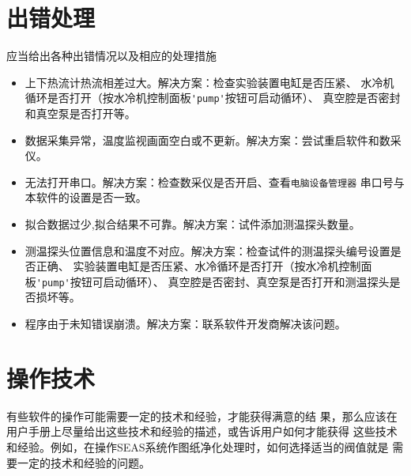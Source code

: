 \section{出错处理}
应当给出各种出错情况以及相应的处理措施
\begin{itemize}
    \item 上下热流计热流相差过大。解决方案：检查实验装置电缸是否压紧、
    水冷机循环是否打开（按水冷机控制面板\lstinline{'pump'}按钮可启动循环）、
    真空腔是否密封和真空泵是否打开等。
    \item 数据采集异常，温度监视画面空白或不更新。解决方案：尝试重启软件和数采仪。
    \item 无法打开串口。解决方案：检查数采仪是否开启、查看\lstinline{电脑设备管理器}
    串口号与本软件的设置是否一致。
    \item 拟合数据过少,拟合结果不可靠。解决方案：试件添加测温探头数量。
    \item 测温探头位置信息和温度不对应。解决方案：检查试件的测温探头编号设置是否正确、
    实验装置电缸是否压紧、水冷循环是否打开（按水冷机控制面板\lstinline{'pump'}按钮可启动循环）、
    真空腔是否密封、真空泵是否打开和测温探头是否损坏等。
    \item 程序由于未知错误崩溃。解决方案：联系软件开发商解决该问题。

\end{itemize}

\section{操作技术}
有些软件的操作可能需要一定的技术和经验，才能获得满意的结
果，那么应该在用户手册上尽量给出这些技术和经验的描述，或告诉用户如何才能获得
这些技术和经验。例如，在操作SEAS系统作图纸净化处理时，如何选择适当的阀值就是
需要一定的技术和经验的问题。